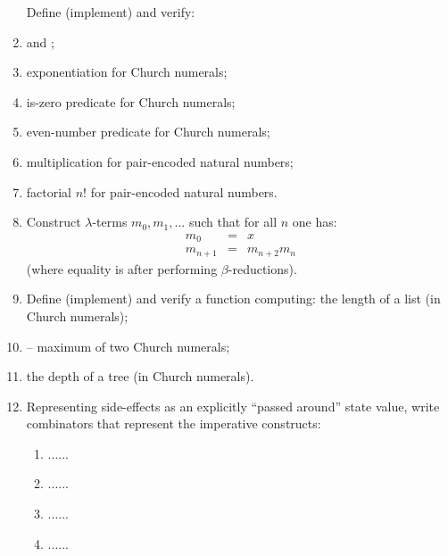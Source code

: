 \documentclass{beamer}
\newcommand{\tmverbatim}[1]{\text{{\ttfamily{#1}}}}
\begin{document}
\begin{enumerate}
  Define (implement) and verify:
  
  \item \tmverbatim{c\_or} and \tmverbatim{c\_not};
  
  \item exponentiation for Church numerals;
  
  \item is-zero predicate for Church numerals;
  
  \item even-number predicate for Church numerals;
  
  \item multiplication for pair-encoded natural numbers;
  
  \item factorial $n!$ for pair-encoded natural numbers.
  
  \item Construct $\lambda$-terms $m_0, m_1, \ldots$ such that for all $n$ one
  has:
  \begin{eqnarray*}
    m_0 & = & x\\
    m_{n + 1} & = & m_{n + 2} m_n
  \end{eqnarray*}
  (where equality is after performing $\beta$-reductions).
  
  \item Define (implement) and verify a function computing: the length of a
  list (in Church numerals);
  
  \item \tmverbatim{cn\_max} -- maximum of two Church numerals;
  
  \item the depth of a tree (in Church numerals).
  
  \item Representing side-effects as an explicitly ``passed around'' state
  value, write combinators that represent the imperative constructs:
  \begin{enumerate}
    \item {}...{}...
    
    \item {}...{}...
    
    \item {}...{}...
    
    \item {}...{}...
    

\end{enumerate}
\end{enumerate}
\end{document}
